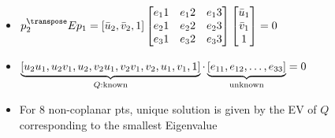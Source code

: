 \begin{itemize}
\begin{itemize}
            \item $p_2^\transpose E p_1 = [\bar u_2, \bar v_2, 1]
                \begin{bmatrix}
                    e_11 & e_12 & e_13\\
                    e_21 & e_22 & e_23\\
                    e_31 & e_32 & e_33
                \end{bmatrix}
                \begin{bmatrix}
                    \bar u_1\\
                    \bar v_1\\
                    1
                \end{bmatrix} = 0$
            \item $\underbrace{[u_2u_1, u_2v_1, u_2, v_2u_1, v_2v_1, v_2, u_1, v_1, 1]}_{Q: \text{known}} \cdot \linebreak \underbrace{[e_{11}, e_{12}, \dots, e_{33}]}_{\text{unknown}} = 0$
            \item For $8$ non-coplanar pts, unique solution is given by the EV of $Q$ corresponding to the smallest Eigenvalue
        \end{itemize}
\end{itemize}

